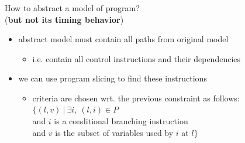 \documentclass{beamer}
\begin{document}
  \begin{frame}
    \frametitle{\secname}
    \framesubtitle{\subsecname}

    \begin{center}
      How to abstract a model of program? \\
      (\textbf{but not its timing behavior})
    \end{center}
    
    \begin{itemize}
      \item abstract model must contain all paths from original model
        \begin{itemize}
          \item i.e. contain all control instructions and their dependencies
        \end{itemize}
        
      \vspace{1em}
      \item we can use program slicing to find these instructions
        \begin{itemize}
          \item criteria are chosen wrt. the previous constraint as follows: \\
 
          $\{(l,v)~|~\exists i, ~(l,i) \in P$ \\
          \hspace{5em} and $i$ is a conditional branching instruction \\
          \hspace{5em} and $v$ is the subset of variables used by $i$ at $l \}$
        \end{itemize}
    \end{itemize}
  \end{frame}
\end{document}
